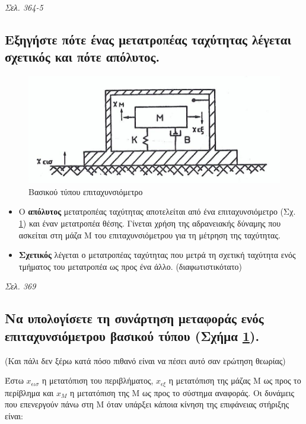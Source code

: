 \documentclass{article}
\begin{document}
\emph{Σελ. 364-5}

\subsection{Εξηγήστε πότε ένας μετατροπέας ταχύτητας λέγεται σχετικός και πότε απόλυτος.}

\begin{figure}[h!]
    \includegraphics[width=\linewidth]{epitaxinsiometro.png}
    \caption{Βασικού τύπου επιταχυνσιόμετρο}
    \label{fig:5.1epitax}
\end{figure}

\begin{itemize}
    \item Ο \textbf{απόλυτος} μετατροπέας ταχύτητας αποτελείται από ένα επιταχυνσιόμετρο (Σχ. \ref{fig:5.1epitax}) και έναν μετατροπέα θέσης.
        Γίνεται χρήση της  αδρανειακής δύναμης που ασκείται στη μάζα Μ του επιταχυνσιόμετρου για τη μέτρηση της ταχύτητας.
    \item \textbf{Σχετικός} λέγεται ο μετατροπέας ταχύτητας που μετρά τη σχετική ταχύτητα ενός τμήματος του μετατροπέα ως προς ένα άλλο. (διαφωτιστικότατο)
\end{itemize}

\emph{Σελ. 369}

\subsection{Να υπολογίσετε τη συνάρτηση μεταφοράς ενός επιταχυνσιόμετρου βασικού τύπου (Σχήμα \ref{fig:5.1epitax}).}
(Και πάλι δεν ξέρω κατά πόσο πιθανό είναι να πέσει αυτό σαν ερώτηση θεωρίας)

Έστω $x_{\epsilon\iota\sigma}$ η μετατόπιση του περιβλήματος, $x_{\epsilon\xi}$ η μετατόπιση της μάζας Μ ως προς το περίβλημα και $x_M$
η μετατόπιση της Μ ως προς το σύστημα αναφοράς. Οι δυνάμεις που επενεργούν πάνω στη Μ όταν υπάρξει κάποια κίνηση της επιφάνειας στήριξης 
είναι:
\end{document}
